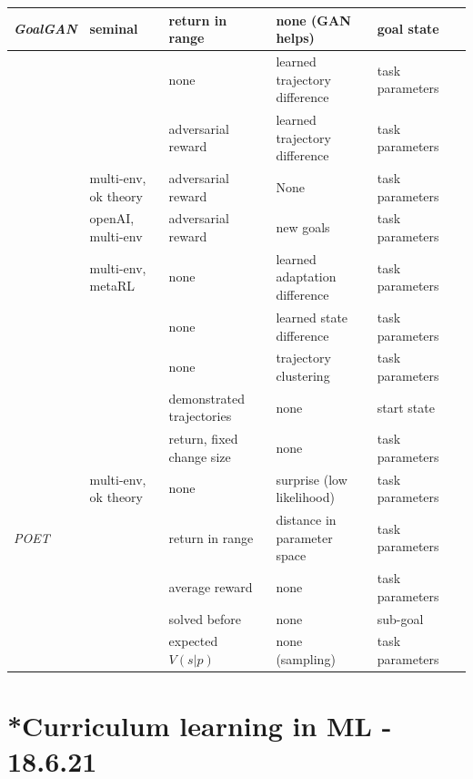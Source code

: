 \documentclass[letterpaper]{article}
\theoremstyle{definition}
\begin{document}
\begin{table}
\begin{tabular}{|l | l | l | l  | l|l|}
	\textit{GoalGAN} \cite{Florensa2018} & seminal & return in range & none (GAN helps) & goal state \\ \hline
	\cite{Mehta2019} &  & none & learned trajectory difference & task parameters \\ \hline
	\cite{Raparthy2020} & & adversarial reward & learned trajectory difference & task parameters \\ \hline
	\cite{Sukhbaatar2017} & multi-env, ok theory & adversarial reward & None & task parameters \\ \hline
	\cite{OpenAI2021} & openAI, multi-env & adversarial reward & new goals & task parameters \\ \hline
	\cite{Mehta2020} & multi-env, metaRL & none & learned adaptation difference & task parameters \\ \hline
	\cite{Gupta2018} & & none & learned state difference & task parameters \\ \hline
	\cite{Jabri2019} & & none & trajectory clustering & task parameters \\ \hline
	\cite{Srinivasan2019} & & demonstrated trajectories & none & start state \\ \hline
	\cite{Akkaya2019} & & return, fixed change size & none & task parameters \\ \hline
	\cite{Kaddour2020} & multi-env, ok theory & none & surprise (low likelihood) & task parameters \\ \hline
	\textit{POET} \cite{Wang2019} & & return in range & distance in parameter space & task parameters \\ \hline
	\cite{Milano2021} & & average reward & none & task parameters \\ \hline
	\cite{Li} & & solved before & none & sub-goal \\ \hline
	\cite{Won2019} & & expected $V(s|p)$ & none (sampling) & task parameters \\ \hline
	
\end{tabular}
\end{table}

\section{*Curriculum learning in ML - 18.6.21} \label{sec:CLML}
\end{document}
